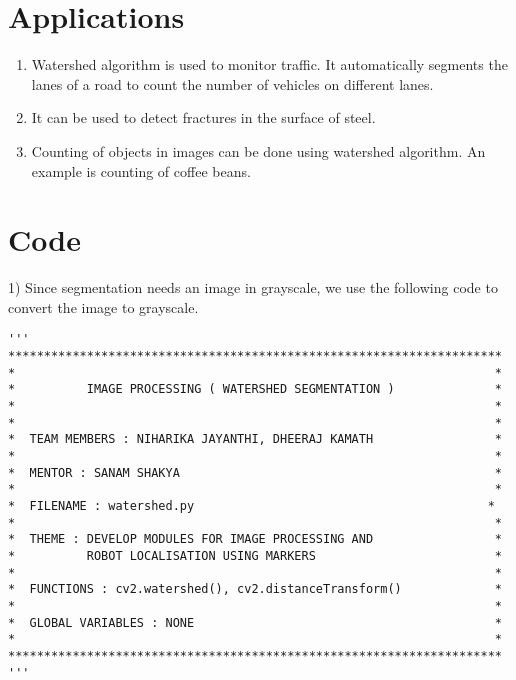 \documentclass[]{article}
\begin{document}
\section{Applications}\label{additional-resources}

\begin{enumerate}
	\item Watershed algorithm is used to monitor traffic. It automatically segments the lanes of a road to count the number of vehicles on different lanes.
	\item It can be used to detect fractures in the surface of steel.
	\item Counting of objects in images can be done using watershed algorithm. An example is counting of coffee beans.
\end{enumerate}
\newpage
\section{Code}\label{code}

1) Since segmentation needs an image in grayscale, we use the following code to convert the image to grayscale.

\begin{verbatim}
'''
*********************************************************************
*                                                                   *
*          IMAGE PROCESSING ( WATERSHED SEGMENTATION )              *
*                                                                   *
*                                                                   *
*  TEAM MEMBERS : NIHARIKA JAYANTHI, DHEERAJ KAMATH                 *
*                                                                   *
*  MENTOR : SANAM SHAKYA                                            *
*                                                                   *
*  FILENAME : watershed.py                                         *
*                                                                   *
*  THEME : DEVELOP MODULES FOR IMAGE PROCESSING AND                 *
*          ROBOT LOCALISATION USING MARKERS                         *
*                                                                   *
*  FUNCTIONS : cv2.watershed(), cv2.distanceTransform()             *
*                                                                   *
*  GLOBAL VARIABLES : NONE                                          *
*                                                                   *
*********************************************************************
'''
\end{verbatim}
\end{document}
